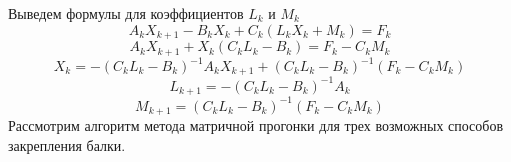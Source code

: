 	Выведем формулы для коэффициентов \(L_k\) и \(M_k\)
	\begin{equation*}
	A_kX_{k+1}-B_kX_k+C_k(L_kX_k+M_k)=F_k
	\end{equation*}
	\begin{equation*}
	A_kX_{k+1}+X_k(C_kL_k-B_k)=F_k-C_kM_k
	\end{equation*}
	\begin{equation*}
	X_k=-(C_kL_k-B_k)^{-1}A_kX_{k+1}+(C_kL_k-B_k)^{-1}(F_k-C_kM_k)
	\end{equation*}
	\begin{equation}\label{eq6}
	L_{k+1}=-(C_kL_k-B_k)^{-1}A_k
	\end{equation}
	\begin{equation}\label{eq7}
	M_{k+1}=(C_kL_k-B_k)^{-1}(F_k-C_kM_k)
	\end{equation}
	Рассмотрим алгоритм метода матричной прогонки для трех возможных способов закрепления балки.
	
